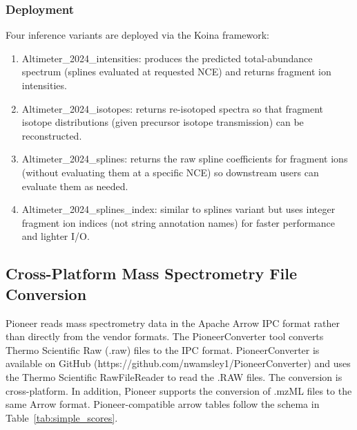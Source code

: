 \documentclass[pdflatex,sn-nature]{sn-jnl}
\begin{document}
\subsubsection{Deployment}\label{subsubsec:altimeter-deployment}
Four inference variants are deployed via the Koina framework:
\begin{adjustwidth}{2em}{0pt}
    \begin{enumerate}
        \item Altimeter\_2024\_intensities: produces the predicted total-abundance spectrum (splines evaluated at requested NCE) and returns fragment ion intensities.
        \item Altimeter\_2024\_isotopes: returns re-isotoped spectra so that fragment isotope distributions (given precursor isotope transmission) can be reconstructed.
        \item Altimeter\_2024\_splines: returns the raw spline coefficients for fragment ions (without evaluating them at a specific NCE) so downstream users can evaluate them as needed.
        \item Altimeter\_2024\_splines\_index: similar to splines variant but uses integer fragment ion indices (not string annotation names) for faster performance and lighter I/O.
    \end{enumerate}
\end{adjustwidth}













\subsection{Cross-Platform Mass Spectrometry File Conversion}\label{subsec:file-conversion}

Pioneer reads mass spectrometry data in the Apache Arrow IPC format rather than directly from the vendor formats. The PioneerConverter tool converts Thermo Scientific Raw (.raw) files to the IPC format. PioneerConverter is available on GitHub (https://github.com/nwamsley1/PioneerConverter) and uses the Thermo Scientific RawFileReader to read the .RAW files. The conversion is cross-platform. In addition, Pioneer supports the conversion of .mzML files to the same Arrow format. Pioneer-compatible arrow tables follow the schema in Table~\ref{tab:simple_scores}. 
\end{document}
